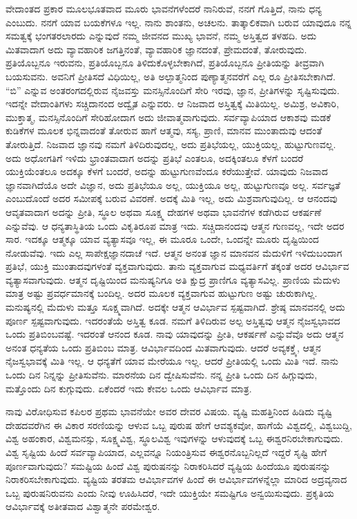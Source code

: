 ವೇದಾಂತದ ಪ್ರಕಾರ ಮೂಲಭೂತವಾದ ಮೂರು ಭಾವನೆಗಳೆಂದರೆ ನಾನಿರುವೆ, ನನಗೆ ಗೊತ್ತಿದೆ, ನಾನು ಧನ್ಯ ಎಂಬುದು. ನನಗೆ ಯಾವ ಬಯಕೆಗಳೂ ಇಲ್ಲ. ನಾನು ಶಾಂತನು, ಅಚಲನು. ತಾತ್ಕಾಲಿಕವಾಗಿ ಬರುವ ಯಾವುದೂ ನನ್ನ ಸಮತ್ವಕ್ಕೆ ಭಂಗತರಲಾರದು ಎನ್ನುವುದೆ ನಮ್ಮ ಜೀವನದ ಮುಖ್ಯ ಭಾವನೆ, ನಮ್ಮ ಅಸ್ತಿತ್ವದ ತಳಹದಿ. ಅದು ಮಿತವಾದಾಗ ಅದು ವ್ಯಾವಹಾರಿಕ ಜಗತ್ತಿನಂತೆ, ವ್ಯಾವಹಾರಿಕ ಜ್ಞಾನದಂತೆ, ಪ್ರೇಮದಂತೆ, ತೋರುವುದು. ಪ್ರತಿಯೊಬ್ಬನೂ ಇರುವನು, ಪ್ರತಿಯೊಬ್ಬನೂ ತಿಳಿದುಕೊಳ್ಳಬೇಕಾಗಿದೆ, ಪ್ರತಿಯೊಬ್ಬನೂ ಪ್ರೀತಿಯನ್ನು ತೀವ್ರವಾಗಿ ಬಯಸುವನು. ಅವನಿಗೆ ಪ್ರೀತಿಸದೆ ವಿಧಿಯಿಲ್ಲ, ಅತಿ ಅಲ್ಪಾತ್ಮನಿಂದ ಪುಣ್ಯಾತ್ಮನವರೆಗೆ ಎಲ್ಲ ರೂ ಪ್ರೀತಿಸಬೇಕಾಗಿದೆ. “ಬಿ'' ಎನ್ನುವ ಅಂತರಂಗದಲ್ಲಿರುವ ನೈಜವಸ್ತು ಮನಸ್ಸಿನೊಂದಿಗೆ ಸೇರಿ ಇರವು, ಜ್ಞಾನ, ಪ್ರೀತಿಗಳನ್ನು ಸೃಷ್ಟಿಸುವುದು. ಇದನ್ನೇ ವೇದಾಂತಿಗಳು ಸಚ್ಚಿದಾನಂದ ಅದ್ವೈತ ಎನ್ನುವರು. ಆ ನಿಜವಾದ ಅಸ್ತಿತ್ವಕ್ಕೆ ಮಿತಿಯಿಲ್ಲ. ಅಮಿಶ್ರ, ಅವಿಕಾರಿ, ಮುಕ್ತಾತ್ಮ, ಮನಸ್ಸಿನೊಂದಿಗೆ ಸೇರಿಹೋದಾಗ ಅದು ಜೀವಾತ್ಮವಾಗುವುದು. ಸರ್ವವ್ಯಾಪಿಯಾದ ಆಕಾಶವು ಮಡಕೆ ಕುಡಿಕೆಗಳ ಮೂಲಕ ಭಿನ್ನವಾದಂತೆ ತೋರುವ ಹಾಗೆ ಆತ್ಮವು, ಸಸ್ಯ, ಪ್ರಾಣಿ, ಮಾನವ ಮುಂತಾದುವು ಆದಂತೆ ತೋರುತ್ತಿದೆ. ನಿಜವಾದ ಜ್ಞಾನವು ನಮಗೆ ತಿಳಿದಿರುವುದಲ್ಲ, ಅದು ಪ್ರತಿಭೆಯಲ್ಲ, ಯುಕ್ತಿಯಲ್ಲ, ಹುಟ್ಟುಗುಣವಲ್ಲ. ಅದು ಅಧೋಗತಿಗೆ ಇಳಿದು ಭ್ರಾಂತವಾದಾಗ ಅದನ್ನು ಪ್ರತಿಭೆ ಎಂತಲೂ, ಅದಕ್ಕಿಂತಲೂ ಕೆಳಗೆ ಬಂದರೆ ಯುಕ್ತಿಯೆಂತಲೂ ಅದಕ್ಕೂ ಕೆಳಗೆ ಬಂದರೆ, ಅದನ್ನು ಹುಟ್ಟುಗುಣವೆಂದೂ ಕರೆಯುತ್ತೇವೆ. ಯಾವುದು ನಿಜವಾದ ಜ್ಞಾನವಾಗಿದೆಯೊ ಅದೇ ವಿಜ್ಞಾನ, ಅದು ಪ್ರತಿಭೆಯೂ ಅಲ್ಲ, ಯುಕ್ತಿಯೂ ಅಲ್ಲ, ಹುಟ್ಟುಗುಣವೂ ಅಲ್ಲ. ಸರ್ವಜ್ಞತೆ ಎಂಬುದೊಂದೆ ಅದರ ಸಮೀಪಕ್ಕೆ ಬರುವ ವಿವರಣೆ. ಅದಕ್ಕೆ ಮಿತಿ ಇಲ್ಲ, ಅದು ಮಿಶ್ರವಾಗುವುದಿಲ್ಲ. ಆ ಆನಂದವು ಆವೃತವಾದಾಗ ಅದನ್ನು ಪ್ರೀತಿ, ಸ್ಥೂಲ ಅಥವಾ ಸೂಕ್ಷ್ಮ ದೇಹಗಳ ಅಥವಾ ಭಾವನೆಗಳ ಕಡೆಗಿರುವ ಆಕರ್ಷಣೆ ಎನ್ನುವೆವು. ಆ ಧನ್ಯತಾಸ್ಥಿತಿಯ ಒಂದು ವಿಕೃತಿರೂಪ ಮಾತ್ರ ಇದು. ಸಚ್ಚಿದಾನಂದವು ಆತ್ಮನ ಗುಣವಲ್ಲ, ಇದೇ ಅದರ ಸಾರ. ಇದಕ್ಕೂ ಆತ್ಮಕ್ಕೂ ಯಾವ ವ್ಯತ್ಯಾಸವೂ ಇಲ್ಲ, ಈ ಮೂರೂ ಒಂದೇ, ಒಂದನ್ನೇ ಮೂರು ದೃಷ್ಟಿಯಿಂದ ನೋಡುವೆವು. ಇದು ಎಲ್ಲ ಸಾಪೇಕ್ಷಜ್ಞಾನದಾಚೆ ಇದೆ. ಆತ್ಮನ ಅನಂತ ಜ್ಞಾನ ಮಾನವನ ಮೆದುಳಿಗೆ ಇಳಿದುಬಂದಾಗ ಪ್ರತಿಭೆ, ಯುಕ್ತಿ ಮುಂತಾದವುಗಳಂತೆ ವ್ಯಕ್ತವಾಗುವುದು. ತಾನು ವ್ಯಕ್ತವಾಗುವ ಮಧ್ಯವರ್ತಿಗೆ ತಕ್ಕಂತೆ ಅದರ ಆವಿರ್ಭಾವ ವ್ಯತ್ಯಾಸವಾಗುವುದು. ಆತ್ಮನ ದೃಷ್ಟಿಯಿಂದ ಮನುಷ್ಯನಿಗೂ ಅತಿ ಕ್ಷುದ್ರ ಪ್ರಾಣಿಗೂ ವ್ಯತ್ಯಾಸವಿಲ್ಲ. ಪ್ರಾಣಿಯ ಮೆದುಳು ಮಾತ್ರ ಅಷ್ಟು ಪ್ರವರ್ಧಮಾನಕ್ಕೆ ಬಂದಿಲ್ಲ. ಅದರ ಮೂಲಕ ವ್ಯಕ್ತವಾಗುವ ಹುಟ್ಟುಗುಣ ಅಷ್ಟು ಚುರುಕಾಗಿಲ್ಲ. ಮನುಷ್ಯನಲ್ಲಿ ಮೆದುಳು ಮತ್ತೂ ಸೂಕ್ಷ್ಮವಾಗಿದೆ. ಅದಕ್ಕೇ ಆತ್ಮನ ಆವಿರ್ಭಾವ ಸ್ಪಷ್ಟವಾಗಿದೆ. ಶ್ರೇಷ್ಠ ಮಾನವನಲ್ಲಿ ಅದು ಪೂರ್ಣ ಸ್ಪಷ್ಟವಾಗುವುದು. ಇದರಂತೆಯೆ ಅಸ್ತಿತ್ವ ಕೂಡ. ನಮಗೆ ತಿಳಿದಿರುವ ಅಲ್ಪ ಅಸ್ತಿತ್ವವು ಆತ್ಮನ ನೈಜಸ್ವಭಾವದ ಒಂದು ಪ್ರತಿಬಿಂಬವಷ್ಟೆ. ಇದರಂತೆ ಆನಂದ ಕೂಡ. ನಾವು ಯಾವುದನ್ನು ಪ್ರೀತಿ, ಆಕರ್ಷಣೆ ಎನ್ನುವೆವೊ ಅದು ಆತ್ಮನ ಅನಂತ ಧನ್ಯತೆಯ ಒಂದು ಪ್ರತಿಬಿಂಬ ಮಾತ್ರ. ಆವಿರ್ಭಾವದಿಂದ ಮಿತವಾಗುವುದು. ಆದರೆ ಅವ್ಯಕಕ್ತ್ಕೆ, ಆತ್ಮನ ನೈಜಸ್ವಭಾವಕ್ಕೆ ಮಿತಿ ಇಲ್ಲ. ಆ ಧನ್ಯತೆಗೆ ಯಾವ ಮೇರೆಯೂ ಇಲ್ಲ. ಆದರೆ ಪ್ರೀತಿಯಲ್ಲಿ ಒಂದು ಮಿತಿ ಇದೆ. ನಾನು ಒಂದು ದಿನ ನಿನ್ನನ್ನು ಪ್ರೀತಿಸುವೆನು. ಮಾರನೆಯ ದಿನ ದ್ವೇಷಿಸುವೆನು. ನನ್ನ ಪ್ರೀತಿ ಒಂದು ದಿನ ಹಿಗ್ಗುವುದು, ಮತ್ತೊಂದು ದಿನ ಕುಗ್ಗುವುದು. ಏಕೆಂದರೆ ಇದು ಕೇವಲ ಒಂದು ಆವಿರ್ಭಾವ ಮಾತ್ರ.

ನಾವು ವಿರೋಧಿಸುವ ಕಪಿಲರ ಪ್ರಥಮ ಭಾವನೆಯೇ ಅವರ ದೇವರ ವಿಷಯ. ವ್ಯಷ್ಟಿ ಮಹತ್ತಿನಿಂದ ಹಿಡಿದು ವ್ಯಷ್ಟಿ ದೇಹದವರೆಗಿನ ಈ ವಿಕಾರ ಸರಣಿಯನ್ನು ಆಳುವ ಒಬ್ಬ ಪುರುಷ ಹೇಗೆ ಆವಶ್ಯಕವೋ, ಹಾಗೆಯೆ ವಿಶ್ವದಲ್ಲಿ, ವಿಶ್ವಬುದ್ದಿ, ವಿಶ್ವ ಅಹಂಕಾರ, ವಿಶ್ವಮನಸ್ಸು, ಸೂಕ್ಷ್ಮವಿಶ್ವ, ಸ್ಥೂಲವಿಶ್ವ ಇವುಗಳನ್ನು ಆಳುವುದಕ್ಕೆ ಒಬ್ಬ ಈಶ್ವರನಿರಬೇಕಾಗುವುದು. ವಿಶ್ವ ಸೃಷ್ಟಿಯ ಹಿಂದೆ ಸರ್ವವ್ಯಾಪಿಯಾದ, ಎಲ್ಲವನ್ನೂ ನಿಯಂತ್ರಿಸುವ ಈಶ್ವರನೊಬ್ಬನಿಲ್ಲದೆ ಇದ್ದರೆ ಸೃಷ್ಟಿ ಹೇಗೆ ಪೂರ್ಣವಾಗುವುದು? ಸಮಷ್ಟಿಯ ಹಿಂದೆ ವಿಶ್ವ ಪುರುಷನನ್ನು ನಿರಾಕರಿಸಿದರೆ ವ್ಯಷ್ಟಿಯ ಹಿಂದೆಯೂ ಪುರುಷನನ್ನು ನಿರಾಕರಿಸಬೇಕಾಗುವುದು. ವ್ಯಷ್ಟಿಯ ತರತಮ ಆವಿರ್ಭಾವಗಳ ಹಿಂದೆ ಈ ಆವಿರ್ಭಾವಗಳನ್ನೆಲ್ಲಾ ಮಾರಿದ ಅದ್ರವ್ಯನಾದ ಒಬ್ಬ ಪುರುಷನಿರುವನು ಎಂದು ನೀವು ಊಹಿಸಿದರೆ, ಇದೇ ಯುಕ್ತಿಯೇ ಸಮಷ್ಟಿಗೂ ಅನ್ವಯಿಸುವುದು. ಪ್ರಕೃತಿಯ ಆವಿರ್ಭಾವಕ್ಕೆ ಅತೀತವಾದ ವಿಶ್ವಾತ್ಮನೇ ಪರಮೇಶ್ವರ.

